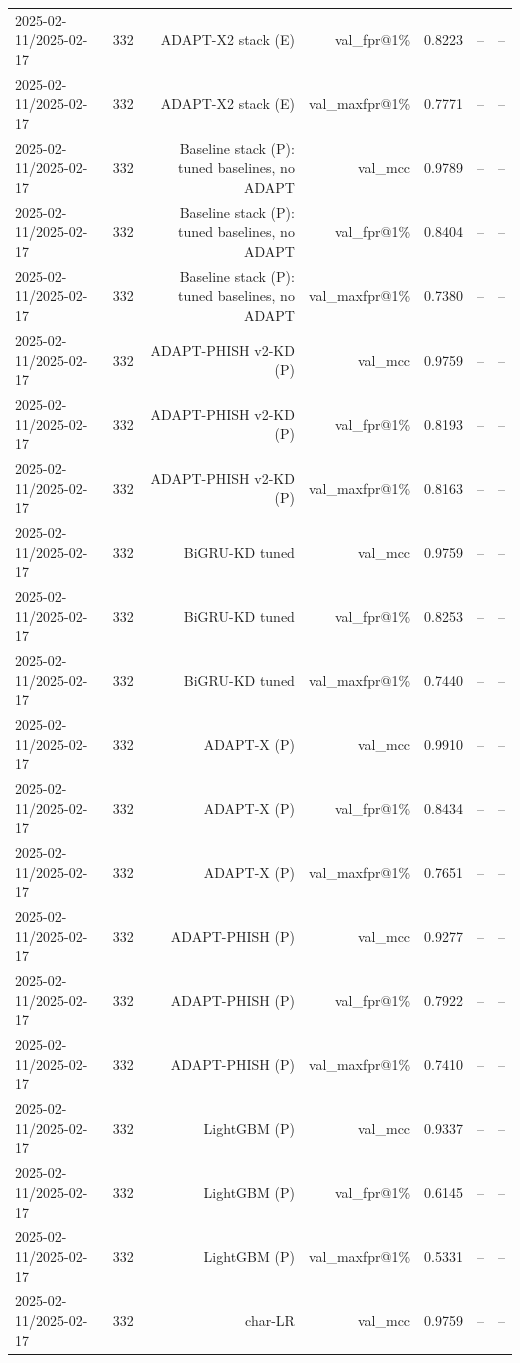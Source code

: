 \begin{table}[t]
\begin{tabular}{llrrrrr}
2025-02-11/2025-02-17 & 332 & ADAPT-X2 stack (E) & val\_fpr@1\% & 0.8223 & -- & -- \\
2025-02-11/2025-02-17 & 332 & ADAPT-X2 stack (E) & val\_maxfpr@1\% & 0.7771 & -- & -- \\
2025-02-11/2025-02-17 & 332 & Baseline stack (P): tuned baselines, no ADAPT & val\_mcc & 0.9789 & -- & -- \\
2025-02-11/2025-02-17 & 332 & Baseline stack (P): tuned baselines, no ADAPT & val\_fpr@1\% & 0.8404 & -- & -- \\
2025-02-11/2025-02-17 & 332 & Baseline stack (P): tuned baselines, no ADAPT & val\_maxfpr@1\% & 0.7380 & -- & -- \\
2025-02-11/2025-02-17 & 332 & ADAPT-PHISH v2-KD (P) & val\_mcc & 0.9759 & -- & -- \\
2025-02-11/2025-02-17 & 332 & ADAPT-PHISH v2-KD (P) & val\_fpr@1\% & 0.8193 & -- & -- \\
2025-02-11/2025-02-17 & 332 & ADAPT-PHISH v2-KD (P) & val\_maxfpr@1\% & 0.8163 & -- & -- \\
2025-02-11/2025-02-17 & 332 & BiGRU-KD tuned & val\_mcc & 0.9759 & -- & -- \\
2025-02-11/2025-02-17 & 332 & BiGRU-KD tuned & val\_fpr@1\% & 0.8253 & -- & -- \\
2025-02-11/2025-02-17 & 332 & BiGRU-KD tuned & val\_maxfpr@1\% & 0.7440 & -- & -- \\
2025-02-11/2025-02-17 & 332 & ADAPT-X (P) & val\_mcc & 0.9910 & -- & -- \\
2025-02-11/2025-02-17 & 332 & ADAPT-X (P) & val\_fpr@1\% & 0.8434 & -- & -- \\
2025-02-11/2025-02-17 & 332 & ADAPT-X (P) & val\_maxfpr@1\% & 0.7651 & -- & -- \\
2025-02-11/2025-02-17 & 332 & ADAPT-PHISH (P) & val\_mcc & 0.9277 & -- & -- \\
2025-02-11/2025-02-17 & 332 & ADAPT-PHISH (P) & val\_fpr@1\% & 0.7922 & -- & -- \\
2025-02-11/2025-02-17 & 332 & ADAPT-PHISH (P) & val\_maxfpr@1\% & 0.7410 & -- & -- \\
2025-02-11/2025-02-17 & 332 & LightGBM (P) & val\_mcc & 0.9337 & -- & -- \\
2025-02-11/2025-02-17 & 332 & LightGBM (P) & val\_fpr@1\% & 0.6145 & -- & -- \\
2025-02-11/2025-02-17 & 332 & LightGBM (P) & val\_maxfpr@1\% & 0.5331 & -- & -- \\
2025-02-11/2025-02-17 & 332 & char-LR & val\_mcc & 0.9759 & -- & -- \\

\end{tabular}
\end{table}
